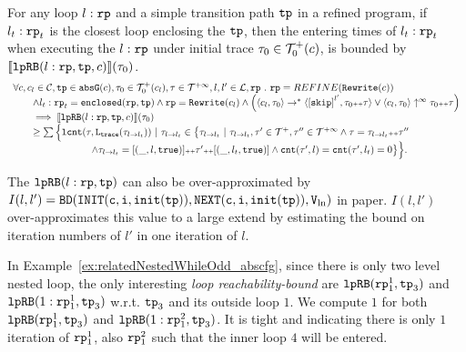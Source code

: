 \begin{lem}
  \label{lem:looprb-sound}
  For any loop $l: \mathtt{rp}$ and a simple transition path $\mathtt{tp}$ in a refined program, if $l_t: \mathtt{rp}_t$ is the closest loop enclosing the $\mathtt{tp}$, then the entering times of $l_t: \mathtt{rp}_t$ when executing the $l: \mathtt{rp}$ under initial trace $\mathtt{\tau}_0 \in \mathcal{T}^{+}_0(c)$, is bounded by $\llbracket \mathtt{lpRB}(l: \mathtt{rp}, \mathtt{tp}, c) \rrbracket(\mathtt{\tau}_0)$.
  \[
    \begin{array}{l}
    \forall c, c_l \in \cdom, \tpath \in \absG(c), \trace_0 \in \ftdom_0(c_l), \trace \in \tdom, l, l' \in \ldom, \rprog \st 
    \rprog = REFINE(\algrewrite(c))
    \\ \qquad
    \land l_t: \rprog_t = \kw{enclosed}(\rprog, \tpath)
    \land 
    \rprog = \algrewrite(c_l)
    \land
    \Big(
    \config{c_l, \trace_0} \to^* \config{\clabel{\eskip}^{l'}, \trace_0 \tracecat \trace}
    \lor \config{c_l, \trace_0} \uparrow^{\infty} \trace_0 \tracecat \trace 
    \Big)
    \\ \qquad
    \implies
    \econfig{\lpchB(l: \rprog, \tpath, c)}(\trace_0) 
    \\ \qquad \geq 
      \sum\Big\{
      \lcounter(\trace, \tracel(\trace_{l \to l_t})) ~\vert~ \trace_{l \to l_t} \in 
      \big\{\trace_{l \to l_t} ~\vert~ 
      \trace_{l \to l_t}, \trace' \in \ftdom, \trace'' \in \tdom
      \land \trace = \trace_{l \to l_t} \tracecat \trace''
      \\ \qquad \qquad \qquad \qquad
      \land \trace_{l \to l_t} = [(\_, l, \etrue)] \tracecat \trace' \tracecat [(\_, l_t, \etrue)]
      \land \counter(\trace', l) = \counter(\trace', l_t) = 0 
      \big\}
      \Big\}.
\end{array}
  \]
\end{lem}
%

The $\mathtt{lpRB}(l:\mathtt{rp}, \mathtt{tp})$ 
can also be over-approximated by
$I(l, l') = \mathtt{BD(INIT(c, i, \mathtt{init}(\mathtt{tp})), NEXT(c, i, \mathtt{init}(\mathtt{tp})), V_{\ln})}$ in paper\cite{GulwaniJK09}.
$I(l, l')$ over-approximates this value to a large extend 
by estimating the bound on iteration numbers of $l'$ in one iteration of $l$.

In Example~\ref{ex:relatedNestedWhileOdd_abscfg}, since there is only two level nested loop,
the only interesting \emph{loop reachability-bound} are $\mathtt{lpRB}(\mathtt{rp}_1^1, \mathtt{tp}_3)$ and $\mathtt{lpRB}(1: \mathtt{rp}_1^1, \mathtt{tp}_3)$ 
w.r.t. $\mathtt{tp}_3$ and its outside loop $1$.
We compute $1$ for both $\mathtt{lpRB}(\mathtt{rp}_1^1, \mathtt{tp}_3)$ and $\mathtt{lpRB}(1: \mathtt{rp}_1^2, \mathtt{tp}_3)$. It is tight and indicating there is only $1$ iteration of $\mathtt{rp}_1^1$, also $\mathtt{rp}_1^2$ such that the inner loop $4$ will be entered.

